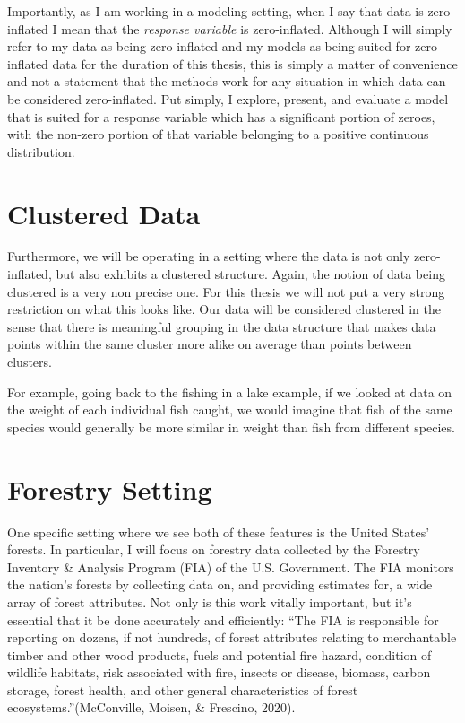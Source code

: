 \documentclass[12pt,twoside]{reedthesis}
\begin{document}
Importantly, as I am working in a modeling setting, when I say that data is zero-inflated I mean that the \emph{response variable} is zero-inflated. Although I will simply refer to my data as being zero-inflated and my models as being suited for zero-inflated data for the duration of this thesis, this is simply a matter of convenience and not a statement that the methods work for any situation in which data can be considered zero-inflated. Put simply, I explore, present, and evaluate a model that is suited for a response variable which has a significant portion of zeroes, with the non-zero portion of that variable belonging to a positive continuous distribution.

\hypertarget{clustered-data}{%
\section{Clustered Data}\label{clustered-data}}

Furthermore, we will be operating in a setting where the data is not only zero-inflated, but also exhibits a clustered structure. Again, the notion of data being clustered is a very non precise one. For this thesis we will not put a very strong restriction on what this looks like. Our data will be considered clustered in the sense that there is meaningful grouping in the data structure that makes data points within the same cluster more alike on average than points between clusters.

For example, going back to the fishing in a lake example, if we looked at data on the weight of each individual fish caught, we would imagine that fish of the same species would generally be more similar in weight than fish from different species.

\hypertarget{forestry-setting}{%
\section{Forestry Setting}\label{forestry-setting}}

One specific setting where we see both of these features is the United States' forests. In particular, I will focus on forestry data collected by the Forestry Inventory \& Analysis Program (FIA) of the U.S. Government. The FIA monitors the nation's forests by collecting data on, and providing estimates for, a wide array of forest attributes. Not only is this work vitally important, but it's essential that it be done accurately and efficiently: ``The FIA is responsible for reporting on dozens, if not hundreds, of forest attributes relating to merchantable timber and other wood products, fuels and potential fire hazard, condition of wildlife habitats, risk associated with fire, insects or disease, biomass, carbon storage, forest health, and other general characteristics of forest ecosystems.''(McConville, Moisen, \& Frescino, 2020).
\end{document}
